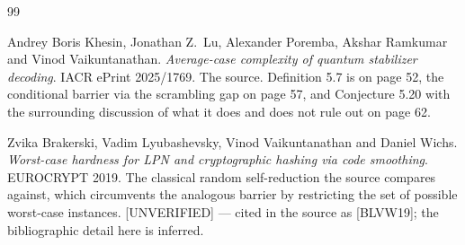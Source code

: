 \documentclass{conjura-conjecture}
\begin{document}
\begin{conjurabibliography}{99}

Andrey Boris Khesin, Jonathan Z.\ Lu, Alexander Poremba, Akshar Ramkumar
and Vinod Vaikuntanathan.
\emph{Average-case complexity of quantum stabilizer decoding}.
IACR ePrint 2025/1769.
The source. Definition 5.7 is on page 52, the conditional barrier via the
scrambling gap on page 57, and Conjecture 5.20 with the surrounding
discussion of what it does and does not rule out on page 62.

Zvika Brakerski, Vadim Lyubashevsky, Vinod Vaikuntanathan and Daniel
Wichs.
\emph{Worst-case hardness for LPN and cryptographic hashing via code
smoothing}.
EUROCRYPT 2019.
The classical random self-reduction the source compares against, which
circumvents the analogous barrier by restricting the set of possible
worst-case instances. [UNVERIFIED] --- cited in the source as [BLVW19];
the bibliographic detail here is inferred.

\end{conjurabibliography}
\end{document}
